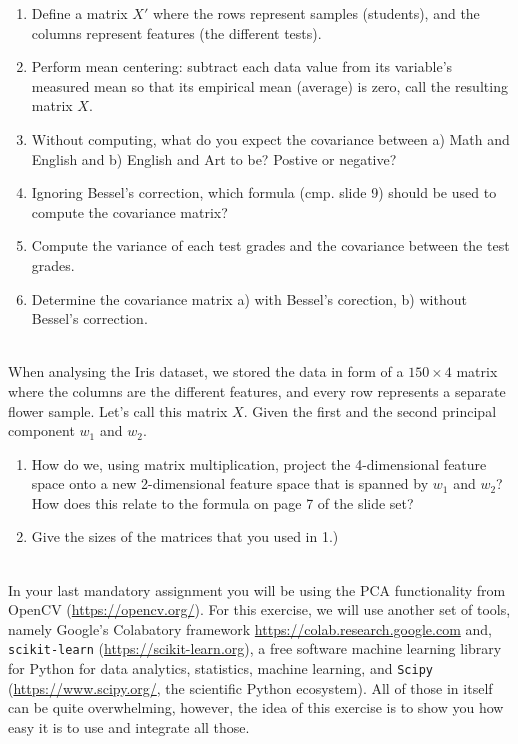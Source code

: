 \documentclass[10pt]{article}
\begin{document}
\begin{enumerate}
\item Define a matrix $X'$ where the rows represent samples (students), and the columns represent features (the different tests).
\item Perform mean centering: subtract each data value from its variable's measured mean so that its empirical mean (average) is zero, call the resulting matrix $X$. 
\item Without computing, what do you expect the covariance between a) Math and English and b) English and Art to be? Postive or negative?
\item Ignoring Bessel's correction, which formula (cmp. slide 9) should be used to compute the covariance matrix?
\item Compute the variance of each test grades and the covariance between the test grades.
\item Determine the covariance matrix a) with Bessel's corection, b) without Bessel's correction.
\end{enumerate}

\\
When analysing the Iris dataset, we stored the data in form of a $150 \times 4$ matrix where the columns are the different features, and every row represents a separate flower sample. Let's call this matrix $X$. Given the first and the second principal component $w_1$ and $w_2$.
\begin{enumerate}
\item How do we, using matrix multiplication, project the 4-dimensional feature space onto a new 2-dimensional feature space that is spanned by $w_1$ and $w_2$? How does this relate to the formula on page 7 of the slide set?
\item Give the sizes of the matrices that you used in 1.)
\end{enumerate}

\\
In your last mandatory assignment you will be using the PCA
functionality from OpenCV (\url{https://opencv.org/}). For this
exercise, we will use another set of tools, namely Google's Colabatory
framework \url{https://colab.research.google.com} and,
\texttt{scikit-learn} (\url{https://scikit-learn.org}), a free
software machine learning library for Python for data analytics,
statistics, machine learning, and \texttt{Scipy}
(\url{https://www.scipy.org/}, the scientific Python ecosystem). All
of those in itself can be quite overwhelming, however, the idea of
this exercise is to show you how easy it is to use and integrate all
those.
\end{document}
